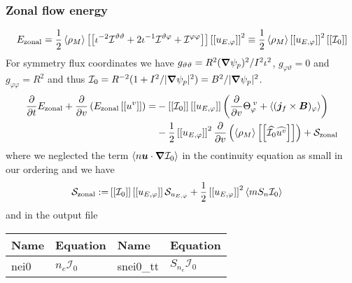 

\subsubsection{Zonal flow energy}
\begin{align}
    E_\mathrm{zonal} = \frac{1}{2}\left \langle \rho_M \right \rangle\left[\left[  \iota^{-2}\mathcal I^{\vartheta\vartheta} + 2\iota^{-1}\mathcal I^{\vartheta\varphi} + \mathcal I^{\varphi\varphi} \right]\right] \left[\left[ u_{E,\varphi} \right]\right]^2
    \equiv \frac{1}{2} \left \langle \rho_M \right \rangle \left[\left[ u_{E,\varphi} \right]\right]^2  \left[\left[ \mathcal I_0 \right]\right]
    \label{eq:zonal_energy}
\end{align}
For symmetry flux coordinates we have $g_{\vartheta\vartheta} = R^2 ({\boldsymbol{\nabla}}\psi_p)^2/I^2\iota^2$, $g_{\varphi\vartheta} =0$ and $g_{\varphi\varphi}=R^2$ and thus $\mathcal I_0 = R^{-2}( 1 + I^2/|{\boldsymbol{\nabla}}\psi_p|^2)= B^2 / |{\boldsymbol{\nabla}}\psi_p|^2$.
\begin{align}\label{eq:perp_kinetic}
      \frac{\partial}{\partial t}E_{\mathrm{zonal}} +\frac{\partial}{\partial v } \left(E_{\mathrm{zonal}}\left[\left[ u^v \right]\right] \right)
  =&-\left[\left[ \mathcal I_0 \right]\right]\left[\left[ u_{E,\varphi} \right]\right]\left(\frac{\partial }{\partial v}  \Theta_{\varphi}^{\; v} + \left \langle ({\boldsymbol{j}}_f\times{\boldsymbol{B}})_\varphi \right \rangle\right)
  \nonumber\\
    &-\frac{1}{2}\left[\left[ u_{E,\varphi} \right]\right]^2\frac{\partial}{\partial v}\left(\left \langle \rho_M \right \rangle\left[\left[ \widehat{\mathcal I_0}\widehat{u^v} \right]\right]\right)
     + \mathcal S_{\mathrm{zonal}}
\end{align}
where we neglected the term $\left \langle n{\boldsymbol{u}}\cdot{\boldsymbol{\nabla}} \mathcal I_0 \right \rangle$ in the continuity equation as small in our ordering
 and we have
 \begin{align}
 \mathcal S_{\mathrm{zonal}} :=& \left[\left[ \mathcal I_0 \right]\right] \left[\left[ u_{E,\varphi} \right]\right] \mathcal S_{u_{E,\varphi}} + \frac{1}{2}\left[\left[ u_{E,\varphi} \right]\right]^2  \left \langle mS_n\mathcal I_0 \right \rangle
 \label{eq:zonal_source}
 \end{align}
 and in the output file
\begin{longtable}{llll}
\toprule
\rowcolor{gray!50}\textbf{Name} &  \textbf{Equation} &
\textbf{Name} &  \textbf{Equation}\\
\midrule
    nei0 &$n_e \mathcal I_0$ &
    snei0\_tt & $S_{n_e } \mathcal I_0$ \\
\bottomrule
\end{longtable}

